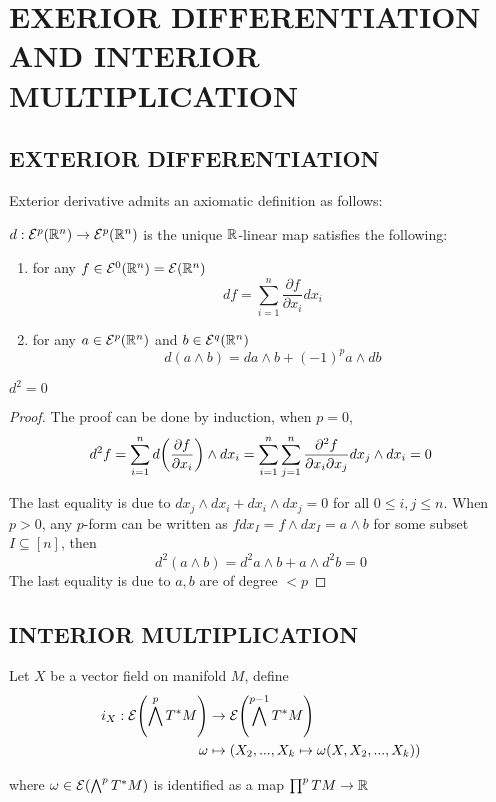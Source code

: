 \section{EXERIOR DIFFERENTIATION AND INTERIOR MULTIPLICATION}

\subsection{EXTERIOR DIFFERENTIATION}

Exterior derivative admits an axiomatic definition as follows:
\begin{definition}
	$d: \mathcal{E}^p(\mathbb{R}^n) \to \mathcal{E}^p(\mathbb{R}^n)$ is the unique $\mathbb{R}$-linear map satisfies the following:
	\begin{enumerate}
		\item for any $f \in \mathcal{E}^0(\mathbb{R}^n) = \mathcal{E}(\mathbb{R}^n)$
		$$
			df = \sum_{i=1}^n \frac{\partial f}{\partial x_i} dx_i
		$$
		
		\item for any $a \in \mathcal{E}^p(\mathbb{R}^n)$ and $b \in \mathcal{E}^q(\mathbb{R}^n)$
		$$
			d(a \wedge b) = da \wedge b + (-1)^p a \wedge db
		$$		
	\end{enumerate}
\end{definition}

\begin{proposition}
	$ d^2 = 0 $
\end{proposition}

\begin{proof}
	The proof can be done by induction, when $p = 0$,
	$$
		d^2 f = \sum_{i=1}^n d\tuple*{\frac{\partial f}{\partial x_i}} \wedge dx_i = \sum_{i=1}^n \sum_{j=1}^n \frac{\partial^2 f}{\partial x_i \partial x_j} dx_j \wedge dx_i = 0
	$$
	
	The last equality is due to $dx_j \wedge dx_i + dx_i \wedge dx_j = 0$ for all $0 \leq i, j \leq n$. When $p > 0$, any $p$-form can be written as $f dx_I = f \wedge dx_I = a \wedge b$ for some subset $I \subseteq [n]$, then
	$$
		d^2(a \wedge b) = d^2 a \wedge b + a \wedge d^2 b = 0
	$$
	The last equality is due to $a, b$ are of degree $< p$
\end{proof}

\subsection{INTERIOR MULTIPLICATION}

\begin{definition}
	Let $X$ be a vector field on manifold $M$, define
	\begin{align*}
		i_X: \E\tuple*{\bigwedge^p T^*M} &\to \E\tuple*{\bigwedge^{p-1} T^*M} \\
				\omega &\mapsto (X_2, ..., X_k \mapsto \omega(X, X_2, ..., X_k))
	\end{align*}
	
	where $\omega \in \E\tuple*{\bigwedge^p T^*M}$ is identified as a map $\prod^p TM \to \mathbb{R}$
\end{definition}

